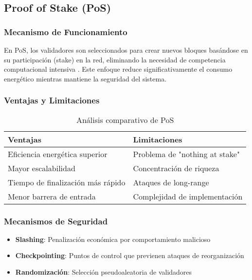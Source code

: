 \subsection{Proof of Stake (PoS)}

\subsubsection{Mecanismo de Funcionamiento}

En PoS, los validadores son seleccionados para crear nuevos bloques basándose en su participación (stake) en la red, eliminando la necesidad de competencia computacional intensiva \cite{king2012ppcoin}. Este enfoque reduce significativamente el consumo energético mientras mantiene la seguridad del sistema.

\subsubsection{Ventajas y Limitaciones}

\begin{table}[h]
\centering
\begin{tabular}{|p{6cm}|p{6cm}|}
\hline
\textbf{Ventajas} & \textbf{Limitaciones} \\
\hline
Eficiencia energética superior & Problema de "nothing at stake" \\
Mayor escalabilidad & Concentración de riqueza \\
Tiempo de finalización más rápido & Ataques de long-range \\
Menor barrera de entrada & Complejidad de implementación \\
\hline
\end{tabular}
\caption{Análisis comparativo de PoS}
\label{tab:pos-comparison}
\end{table}

\subsubsection{Mecanismos de Seguridad}

\begin{itemize}
    \item \textbf{Slashing}: Penalización económica por comportamiento malicioso
    \item \textbf{Checkpointing}: Puntos de control que previenen ataques de reorganización
    \item \textbf{Randomización}: Selección pseudoaleatoria de validadores
\end{itemize}

